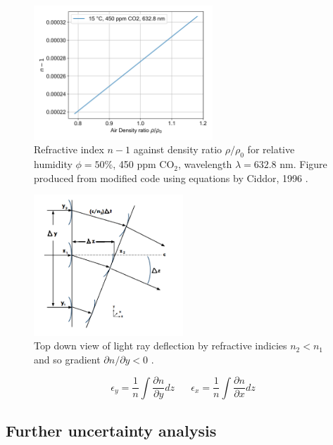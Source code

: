\documentclass{article}
\begin{document}
\begin{figure}[H]
    \centering
    \includegraphics[width=0.6\textwidth]{dry_air_15_rho_vs_n.png}
    \caption{Refractive index $n-1$ against density ratio $\rho/\rho_0$ for relative humidity $\phi = 50\%$, 450 ppm $ \text{CO}_2 $, wavelength $\lambda = 632.8$ nm. Figure produced from modified code \cite{refractiveindex_info} using equations by Ciddor, 1996 \cite{Ciddor:96}.}
    \label{fig:refractive_index_vs_density}
\end{figure}

\begin{figure}[H]
    \centering
    \includegraphics[width=0.5\textwidth]{Mazumdar_Amrita_shlierien_refraction.png}
    \caption{Top down view of light ray deflection by refractive indicies $n_2 < n_1$ and so gradient $\partial n/ \partial y < 0$ \cite{Mazumdar_Amrita:2013}.}
    \label{fig:refraction_diagram}
\end{figure}

\begin{equation}
    \epsilon_y = \frac{1}{n}\int \frac{\partial n}{\partial y} dz \;\;\;\;\;\; \epsilon_x = \frac{1}{n}\int \frac{\partial n}{\partial x} dz
    \label{eqn:refractive_index_gradient}
\end{equation}

\subsection{Further uncertainty analysis}
\end{document}
